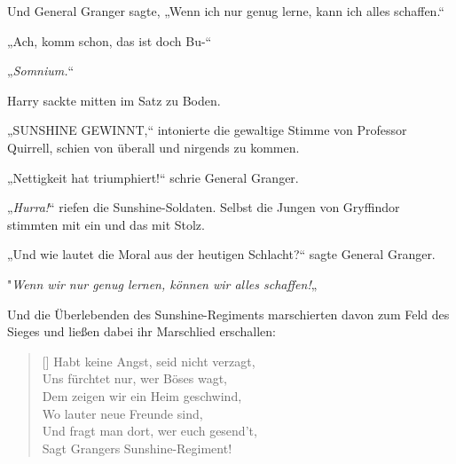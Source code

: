 Und General Granger sagte, „Wenn ich nur genug lerne, kann ich alles schaffen.“

„Ach, komm schon, das ist doch Bu-“

„\emph{Somnium.}“

Harry sackte mitten im Satz zu Boden.

„SUNSHINE GEWINNT,“ intonierte die gewaltige Stimme von Professor Quirrell, schien von überall und nirgends zu kommen.

„Nettigkeit hat triumphiert!“ schrie General Granger.

„\emph{Hurra!}“ riefen die Sunshine-Soldaten. Selbst die Jungen von Gryffindor stimmten mit ein und das mit Stolz.

„Und wie lautet die Moral aus der heutigen Schlacht?“ sagte General Granger.

"\emph{Wenn wir nur genug lernen, können wir alles schaffen!}„

Und die Überlebenden des Sunshine-Regiments marschierten davon zum Feld des Sieges und ließen dabei ihr Marschlied erschallen:

\begin{verse}[\versewidth]
Habt keine Angst, seid nicht verzagt,\\
Uns fürchtet nur, wer Böses wagt,\\
Dem zeigen wir ein Heim geschwind,\\
Wo lauter neue Freunde sind,\\
Und fragt man dort, wer euch gesend't,\\
Sagt Grangers Sunshine-Regiment!
\end{verse}


